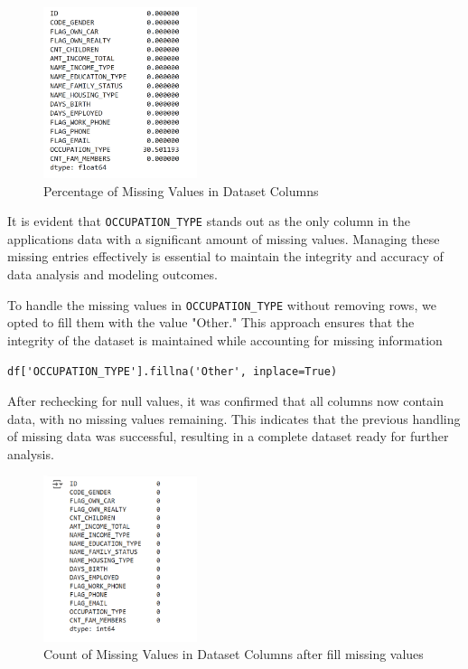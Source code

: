 \documentclass[12pt]{report}
\begin{document}
    \begin{figure}[h!]
        \centering
        \includegraphics[width=0.4\textwidth]{resources/pic/Percentage of Missing Values in Dataset Columns.png}
        \caption{Percentage of Missing Values in Dataset Columns}
        \label{Percentage of Missing Values in Dataset Columns}
    \end{figure}

    It is evident that \texttt{OCCUPATION\_TYPE} stands out as the only column in the applications data with a significant amount of missing values. Managing these missing entries effectively is essential to maintain the integrity and accuracy of data analysis and modeling outcomes.
    
    To handle the missing values in \texttt{OCCUPATION\_TYPE} without removing rows, we opted to fill them with the value "Other." This approach ensures that the integrity of the dataset is maintained while accounting for missing information

    \begin{lstlisting}[style=default, language=python*, gobble=3]
        df['OCCUPATION_TYPE'].fillna('Other', inplace=True)
    \end{lstlisting}

    After rechecking for null values, it was confirmed that all columns now contain data, with no missing values remaining. This indicates that the previous handling of missing data was successful, resulting in a complete dataset ready for further analysis.

    \begin{figure}[h!]
        \centering
        \includegraphics[width=0.4\textwidth]{resources/pic/Count of Missing Values in Dataset Columns after fill missing values.png}
        \caption{Count of Missing Values in Dataset Columns after fill missing values}
        \label{Count of Missing Values in Dataset Columns after fill missing values}
    \end{figure}
\end{document}
